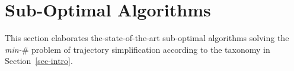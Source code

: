 \newtheorem{theorem}{Theorem}
\newtheorem{lemma}{Lemma}

\section{Sub-Optimal Algorithms}
\label{sec-subopt}



This section elaborates the-state-of-the-art sub-optimal algorithms solving the \emph{min-$\#$} problem of trajectory simplification according to the taxonomy in Section~\ref{sec-intro}.









